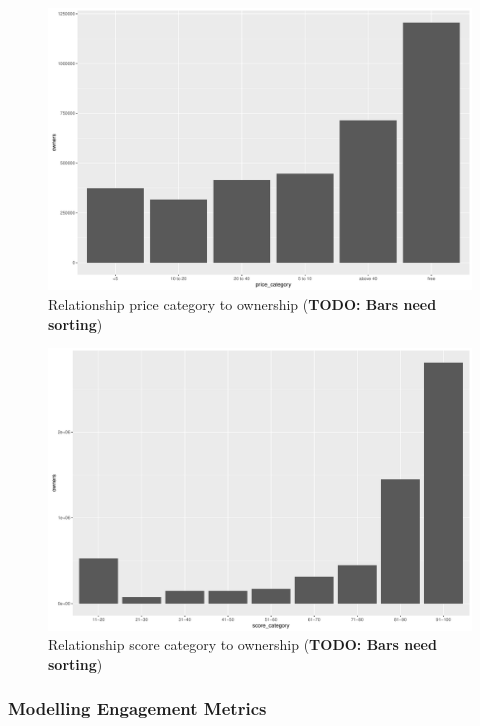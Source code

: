 \begin{figure}[!t]
	\centering
	\includegraphics[width=1.0\columnwidth]{images/rel-price-category-owners.pdf}
	\caption{Relationship price category to ownership (\textbf{TODO: Bars need sorting})}
\label{fig:rel-price-category-owners}
\end{figure}

\begin{figure}[!t]
	\centering
	\includegraphics[width=1.0\columnwidth]{images/rel-score-category-owners.pdf}
	\caption{Relationship score category to ownership (\textbf{TODO: Bars need sorting})}
\label{fig:rel-score-category-owners}
\end{figure}

\subsubsection{Modelling Engagement Metrics}

